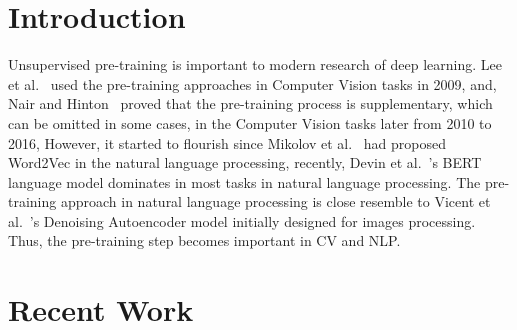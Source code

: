 \documentclass[runningheads]{llncs}
\begin{document}
\section{Introduction}

  Unsupervised pre-training is important to modern research of deep learning.
  Lee et al.~\cite{lee2009convolutional} used the pre-training approaches in Computer Vision tasks in 2009,
  and, Nair and Hinton~\cite{nair2010rectified} proved that the pre-training process is supplementary, which can be omitted in some cases, in the Computer Vision tasks later from 2010 to 2016,
  However, it started to flourish since Mikolov et al.~\cite{mikolov2013distributed} had proposed Word2Vec in the natural language processing,
  recently, Devin et al.~\cite{devlin2019bert}'s BERT language model dominates in most tasks in natural language processing.
  The pre-training approach in natural language processing is close resemble to Vicent et al.~\cite{vincent2008extracting}'s Denoising Autoencoder model initially designed for images processing.
  Thus, the pre-training step becomes important in CV and NLP.


\section{Recent Work}
\end{document}
